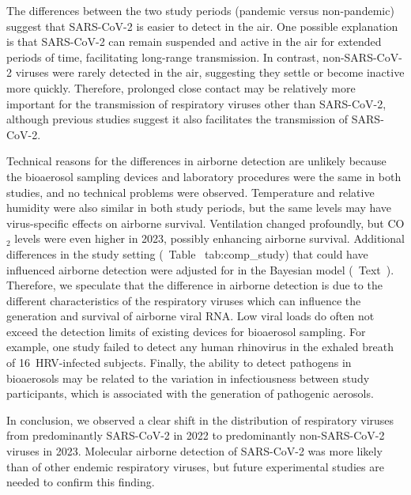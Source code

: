\documentclass[fleqn,11pt]{wlscirep}
\begin{document}
The differences between the two study periods (pandemic versus non-pandemic) suggest that SARS-CoV-2 is easier to detect in the air. One possible explanation is that SARS-CoV-2 can remain suspended and active in the air for extended periods of time, facilitating long-range transmission. In contrast, non-SARS-CoV-2 viruses were rarely detected in the air, suggesting they settle or become inactive more quickly. Therefore, prolonged close contact may be relatively more important for the transmission of respiratory viruses other than SARS-CoV-2, although previous studies suggest it also facilitates the transmission of SARS-CoV-2\cite{Leung2020NatMed,Lind2023NatCommun}.

Technical reasons for the differences in airborne detection are unlikely because the bioaerosol sampling devices and laboratory procedures were the same in both studies, and no technical problems were observed. Temperature and relative humidity were also similar in both study periods, but the same levels may have virus-specific effects on airborne survival\cite{Tellier2009JTRSI,Davis1971AM}. Ventilation changed profoundly, but CO$_2$ levels were even higher in 2023, possibly enhancing airborne survival. Additional differences in the study setting (\supp~Table~\zref
{tab:comp_study}) that could have influenced airborne detection were adjusted for in the Bayesian model (\supp~Text~). Therefore, we speculate that the difference in airborne detection is due to the different characteristics of the respiratory viruses which can influence the generation and survival of airborne viral RNA\cite{Wang2021}. Low viral loads do often not exceed the detection limits of existing devices for bioaerosol sampling. For example, one study failed to detect any human rhinovirus in the exhaled breath of 16~HRV-infected subjects\cite{Fabian2011JAMPDD}. Finally, the ability to detect pathogens in bioaerosols may be related to the variation in infectiousness between study participants, which is associated with the generation of pathogenic aerosols\cite{Leung2020NatMed,Bischoff2013JID}. 

In conclusion, we observed a clear shift in the distribution of respiratory viruses from predominantly SARS-CoV-2 in 2022 to predominantly non-SARS-CoV-2 viruses in 2023. Molecular airborne detection of SARS-CoV-2 was more likely than of other endemic respiratory viruses, but future experimental studies are needed to confirm this finding.   



\end{document}
